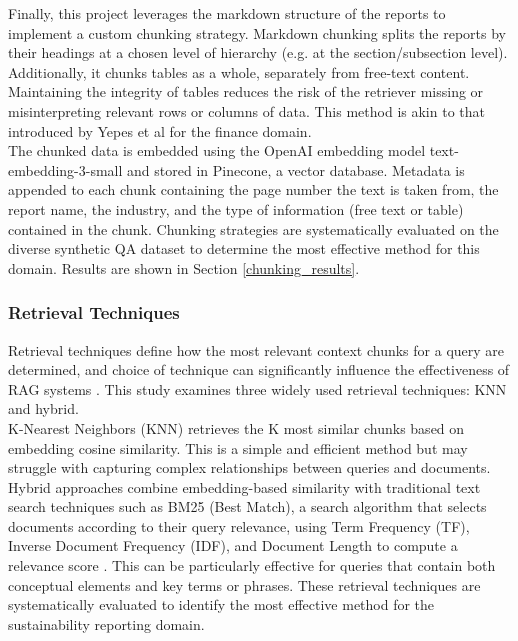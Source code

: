 Finally, this project leverages the markdown structure of the reports to implement a custom chunking strategy. Markdown chunking splits the reports by their headings at a chosen level of hierarchy (e.g. at the section/subsection level). Additionally, it chunks tables as a whole, separately from free-text content. Maintaining the integrity of tables reduces the risk of the retriever missing or misinterpreting relevant rows or columns of data. This method is akin to that introduced by Yepes et al \cite{yepes2024financial} for the finance domain. \\

The chunked data is embedded using the OpenAI embedding model text-embedding-3-small and stored in Pinecone, a vector database. Metadata is appended to each chunk containing the page number the text is taken from, the report name, the industry, and the type of information (free text or table) contained in the chunk. Chunking strategies are systematically evaluated on the diverse synthetic QA dataset to determine the most effective method for this domain. Results are shown in Section \ref{chunking_results}.



\subsubsection{Retrieval Techniques}

Retrieval techniques define how the most relevant context chunks for a query are determined, and choice of technique can significantly influence the effectiveness of RAG systems \cite{gao2024retrievalaugmented}. This study examines three widely used retrieval techniques: KNN and hybrid.\\

K-Nearest Neighbors (KNN) retrieves the K most similar chunks based on embedding cosine similarity. This is a simple and efficient method but may struggle with capturing complex relationships between queries and documents. Hybrid approaches combine embedding-based similarity with traditional text search techniques such as BM25 (Best Match), a search algorithm that selects documents according to their query relevance, using Term Frequency (TF), Inverse Document Frequency (IDF), and Document Length to compute a relevance score \cite{sawarkar2024blended}. This can be particularly effective for queries that contain both conceptual elements and key terms or phrases. These retrieval techniques are systematically evaluated to identify the most effective method for the sustainability reporting domain.  \\


